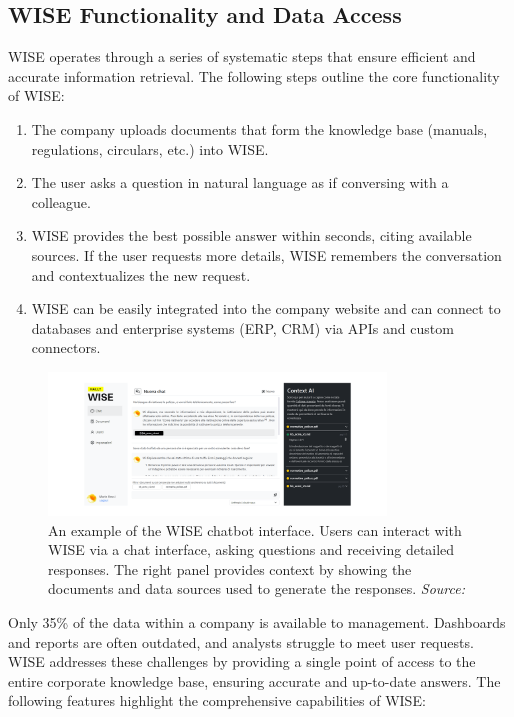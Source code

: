 \subsection{WISE Functionality and Data Access}

WISE operates through a series of systematic steps that ensure efficient and accurate information retrieval. The following steps outline the core functionality of WISE:

\begin{enumerate}
    \item The company uploads documents that form the knowledge base (manuals, regulations, circulars, etc.) into WISE.
    \item The user asks a question in natural language as if conversing with a colleague.
    \item WISE provides the best possible answer within seconds, citing available sources. If the user requests more details, WISE remembers the conversation and contextualizes the new request.
    \item WISE can be easily integrated into the company website and can connect to databases and enterprise systems (ERP, CRM) via APIs and custom connectors.
\end{enumerate}

\begin{figure}[h!]
    \centering
    \includegraphics[width=0.8\textwidth]{images/wise/wise-chat-UX.png}
    \caption{An example of the WISE chatbot interface. Users can interact with WISE via a chat interface, asking questions and receiving detailed responses. The right panel provides context by showing the documents and data sources used to generate the responses. \textit{Source:} \cite{hpa2024}}
    \label{fig:wise-chat-ux}
\end{figure}

Only 35\% of the data within a company is available to management. Dashboards and reports are often outdated, and analysts struggle to meet user requests. WISE addresses these challenges by providing a single point of access to the entire corporate knowledge base, ensuring accurate and up-to-date answers. The following features highlight the comprehensive capabilities of WISE:

